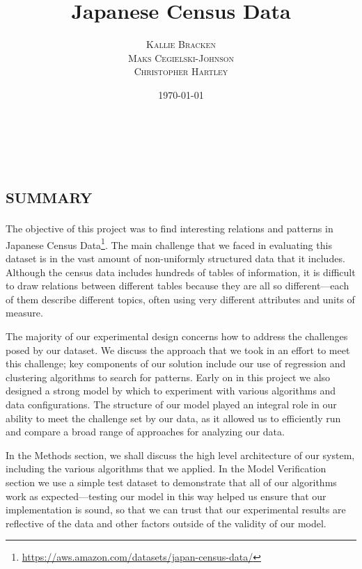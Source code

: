 \documentclass[a4paper, 11pt]{article} %
\title{\textbf{Japanese Census Data} %
} %
\author{\textsc{Kallie Bracken\\Maks Cegielski-Johnson\\Christopher Hartley} %
}
\date{\today} %
\makeatletter
\renewcommand{\maketitle}{ %
\begin{flushright} %
{\LARGE\@title} %

\vspace{40pt} %

{\large\@author} %
\\\@date %

\vspace{40pt} %
\end{flushright}
}
\makeatother
\begin{document}
\maketitle %



\section{\textsc{summary}}
The objective of this project was to find interesting relations and patterns in Japanese Census Data\footnote{\url{https://aws.amazon.com/datasets/japan-census-data/}}. The main challenge that we faced in evaluating this dataset is in the vast amount of non-uniformly structured data that it includes. Although the census data includes hundreds of tables of information, it is difficult to draw relations between different tables because they are all so different---each of them describe different topics, often using very different attributes and units of measure. 

The majority of our experimental design concerns how to address the challenges posed by our dataset. We discuss the approach that we took in an effort to meet this challenge; key components of our solution include our use of regression and clustering algorithms to search for patterns. Early on in this project we also designed a strong model by which to experiment with various algorithms and data configurations. The structure of our model played an integral role in our ability to meet the challenge set by our data, as it allowed us to efficiently run and compare a broad range of approaches for analyzing our data. 

In the Methods section, we shall discuss the high level architecture of our system, including the various algorithms that we applied. In the Model Verification section we use a simple test dataset to demonstrate that all of our algorithms work as expected---testing our model in this way helped us ensure that our implementation is sound, so that we can trust that our experimental results are reflective of the data and other factors outside of the validity of our model. 
\end{document}
